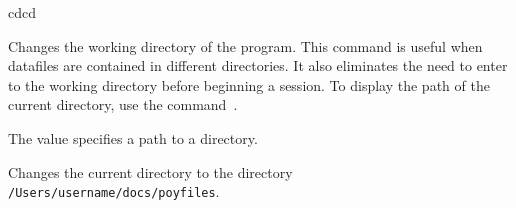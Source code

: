 \begin{command}{cd}{cd}

	\syntax{\obligatory{(\poystring)}}

	\begin{poydescription}
            Changes the working directory of the program. This command is useful
            when datafiles are contained in different directories. It also
            eliminates the need to enter to the working directory before
            beginning a \poy session. To display the path of the current
            directory, use the command~.
	\end{poydescription}

	\begin{arguments}
            {The value specifies a path to a directory.}
            {}
	\end{arguments}
	
	\begin{poyexamples}

            {Changes the current directory to the directory \\
            \texttt{/Users/username/docs/poyfiles}.}

    \end{poyexamples}

    \begin{poyalso}
    \end{poyalso}

\end{command}

